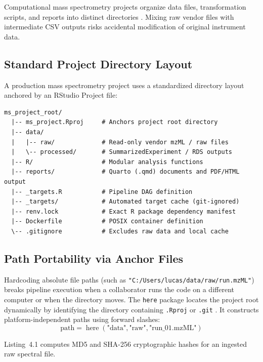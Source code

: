 \documentclass[11pt,twoside,openright]{book}
\begin{document}
Computational mass spectrometry projects organize data files, transformation scripts, and reports into distinct directories \cite{marwick2018packaging, sandve2013ten}. Mixing raw vendor files with intermediate CSV outputs risks accidental modification of original instrument data.

\subsection{Standard Project Directory Layout}

A production mass spectrometry project uses a standardized directory layout anchored by an RStudio Project file:
\begin{verbatim}
ms_project_root/
  |-- ms_project.Rproj     # Anchors project root directory
  |-- data/
  |   |-- raw/             # Read-only vendor mzML / raw files
  |   \-- processed/       # SummarizedExperiment / RDS outputs
  |-- R/                   # Modular analysis functions
  |-- reports/             # Quarto (.qmd) documents and PDF/HTML output
  |-- _targets.R           # Pipeline DAG definition
  |-- _targets/            # Automated target cache (git-ignored)
  |-- renv.lock            # Exact R package dependency manifest
  |-- Dockerfile           # POSIX container definition
  \-- .gitignore           # Excludes raw data and local cache
\end{verbatim}

\subsection{Path Portability via Anchor Files}

Hardcoding absolute file paths (such as \texttt{"C:/Users/lucas/data/raw/run.mzML"}) breaks pipeline execution when a collaborator runs the code on a different computer or when the directory moves. The \texttt{here} package locates the project root dynamically by identifying the directory containing \texttt{.Rproj} or \texttt{.git} \cite{muller2020here}. It constructs platform-independent paths using forward slashes:
\begin{equation}
\text{path} = \operatorname{here}(\text{"data"}, \text{"raw"}, \text{"run\_01.mzML"})
\label{eq:here_path}
\end{equation}

Listing~4.1 computes MD5 and SHA-256 cryptographic hashes for an ingested raw spectral file.
\end{document}
